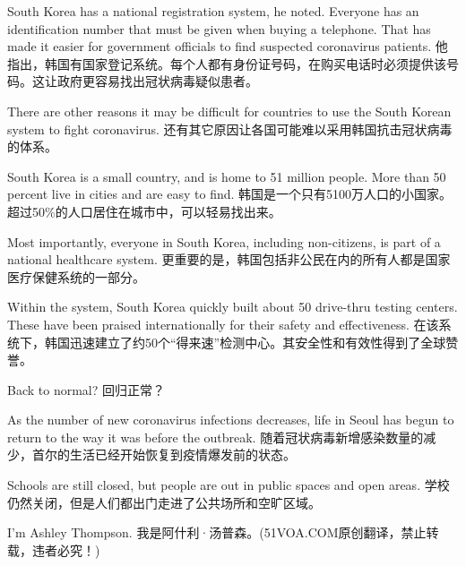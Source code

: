 South Korea has a national registration system, he noted. Everyone has an identification number that must be given when buying a telephone. That has made it easier for government officials to find suspected coronavirus patients.
他指出，韩国有国家登记系统。每个人都有身份证号码，在购买电话时必须提供该号码。这让政府更容易找出冠状病毒疑似患者。

There are other reasons it may be difficult for countries to use the South Korean system to fight coronavirus.
还有其它原因让各国可能难以采用韩国抗击冠状病毒的体系。

South Korea is a small country, and is home to 51 million people. More than 50 percent live in cities and are easy to find.
韩国是一个只有5100万人口的小国家。超过50\%的人口居住在城市中，可以轻易找出来。

Most importantly, everyone in South Korea, including non-citizens, is part of a national healthcare system.
更重要的是，韩国包括非公民在内的所有人都是国家医疗保健系统的一部分。

Within the system, South Korea quickly built about 50 drive-thru testing centers. These have been praised internationally for their safety and effectiveness.
在该系统下，韩国迅速建立了约50个“得来速”检测中心。其安全性和有效性得到了全球赞誉。

Back to normal?
回归正常？

As the number of new coronavirus infections decreases, life in Seoul has begun to return to the way it was before the outbreak.
随着冠状病毒新增感染数量的减少，首尔的生活已经开始恢复到疫情爆发前的状态。

Schools are still closed, but people are out in public spaces and open areas.
学校仍然关闭，但是人们都出门走进了公共场所和空旷区域。

I'm Ashley Thompson.
我是阿什利·汤普森。(51VOA.COM原创翻译，禁止转载，违者必究！) \newline

